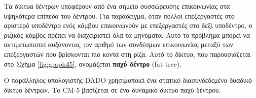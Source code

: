 \documentclass[12pt,a4paper]{article}
\begin{document}
Τα δίκτυα δέντρων υποφέρουν από ένα σημείο συσσώρευσης επικοινωνίας στα 
υψηλότερα επίπεδα του δέντρου. Για παράδειγμα, όταν πολλοί επεξεργαστές 
στο αριστερό υποδέντρο ενός κόμβου επικοινωνούν με επεξεργαστές στο δεξί 
υποδέντρο, ο ριζικός κόμβος πρέπει να διαχειριστεί όλα τα μηνύματα. 
Αυτό το πρόβλημα μπορεί να αντιμετωπιστεί αυξάνοντας τον αριθμό των συνδέσμων 
επικοινωνίας μεταξύ των επεξεργαστών που βρίσκονται πιο κοντά στη ρίζα. 
Αυτό το δίκτυο, που παρουσιάζεται στο Σχήμα \ref{fig:graph45}, ονομάζεται 
\textbf{παχύ δέντρο} (\foreignlanguage{english}{fat tree}).

Ο παράλληλος υπολογιστής \foreignlanguage{english}{DADO} χρησιμοποιεί ένα 
στατικό διασυνδεδεμένο δυαδικό δίκτυο δέντρων. Το \foreignlanguage{english}{CM-5} 
βασίζεται σε ένα δυναμικό δίκτυο παχύ δέντρου.

\begin{figure}[H]
\centering
{}
\end{figure}
\end{document}
